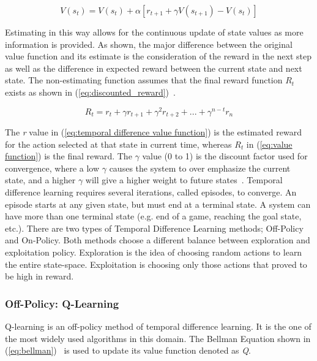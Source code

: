 \documentclass[12pt,american]{report}
\begin{document}
        \begin{equation}
            \label{eq:temporal difference value function}
            V(s_{t}) = V(s_{t}) + \alpha[r_{t+1} + \gamma V(s_{t+1})-V(s_{t})]
        \end{equation}
        
        Estimating in this way allows for the continuous update of state values as more information is provided. As shown, the major difference between the original value function and its estimate is the consideration of the reward in the next step as well as the difference in expected reward between the current state and next state. The non-estimating function assumes that the final reward function \textit{$R_{t}$} exists as shown in (\ref{eq:discounted_reward})~\cite{matiisen_2015}.
        
        \begin{equation}
            \label{eq:discounted_reward}
            R_{t} = r_t + \gamma r_{t+1} + \gamma^2 r_{t+2} + ... + \gamma^{n-t}r_n 
        \end{equation}
        
        The \textit{r} value in (\ref{eq:temporal difference value function}) is the estimated reward for the action selected at that state in current time, whereas \textit{$R_t$} in (\ref{eq:value function}) is the final reward.  The \begin{math}\gamma\end{math} value (0 to 1) is the discount factor used for convergence, where a low \begin{math}\gamma\end{math} causes the system to over emphasize the current state, and a higher \begin{math}\gamma\end{math} will give a higher weight to future states~\cite{Eden}. Temporal difference learning requires several iterations, called episodes, to converge. An episode starts at any given state, but must end at a terminal state.  A system can have more than one terminal state (e.g. end of a game, reaching the goal state, etc.). There are two types of Temporal Difference Learning methods; Off-Policy and On-Policy.  Both methods choose a different balance between exploration and exploitation policy.  Exploration is the idea of choosing random actions to learn the entire state-space.  Exploitation is choosing only those actions that proved to be high in reward.
        
        
        \subsubsection{Off-Policy: Q-Learning}
        Q-learning is an off-policy method of temporal difference learning. It is the one of the most widely used algorithms in this domain. The Bellman Equation shown in (\ref{eq:bellman})~\cite{matiisen_2015} is used to update its value function denoted as \textit{Q}.
        
\end{document}
